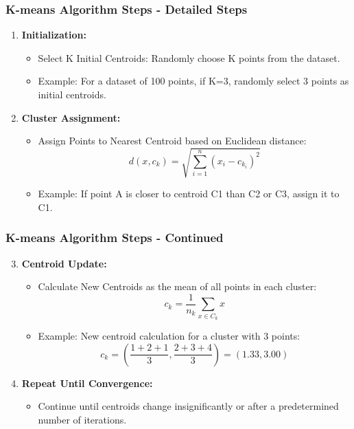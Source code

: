 \documentclass{beamer}
\begin{document}
\begin{frame}[fragile]
    \frametitle{K-means Algorithm Steps - Detailed Steps}
    \begin{enumerate}
        \item \textbf{Initialization:}
        \begin{itemize}
            \item Select K Initial Centroids: Randomly choose K points from the dataset.
            \item Example: For a dataset of 100 points, if K=3, randomly select 3 points as initial centroids.
        \end{itemize}
        
        \item \textbf{Cluster Assignment:}
        \begin{itemize}
            \item Assign Points to Nearest Centroid based on Euclidean distance:
            \begin{equation}
                d(x, c_k) = \sqrt{\sum_{i=1}^{n}(x_i - c_{k_i})^2}
            \end{equation}
            \item Example: If point A is closer to centroid C1 than C2 or C3, assign it to C1.
        \end{itemize}
    \end{enumerate}
\end{frame}

\begin{frame}[fragile]
    \frametitle{K-means Algorithm Steps - Continued}
    \begin{enumerate}
        \setcounter{enumi}{2} %
        \item \textbf{Centroid Update:}
        \begin{itemize}
            \item Calculate New Centroids as the mean of all points in each cluster:
            \begin{equation}
                c_k = \frac{1}{n_k} \sum_{x \in C_k} x
            \end{equation}
            \item Example: New centroid calculation for a cluster with 3 points:
            \begin{equation}
                c_k = \left(\frac{1+2+1}{3}, \frac{2+3+4}{3}\right) = (1.33, 3.00)
            \end{equation}
        \end{itemize}
        
        \item \textbf{Repeat Until Convergence:}
        \begin{itemize}
            \item Continue until centroids change insignificantly or after a predetermined number of iterations.
        \end{itemize}
    \end{enumerate}
\end{frame}
\end{document}
